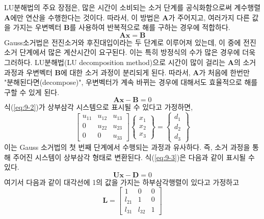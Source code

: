 LU분해법의 주요 장점은, 많은 시간이 소비되는 소거 단계를 공식화함으로써 계수행렬 $\mathbf{A}$에만 연산을 수행한다는 것이다. 따라서, 이 방법은 $\mathbf{A}$가 주어지고, 여러가지 다른 값을 가지는 우변벡터 $\mathbf{B}$를 사용하여 반복적으로 해를 구하는 경우에 적합하다.
\begin{equation}\label{eq:9-1}
\mathbf{Ax}=\mathbf{B}
\end{equation}
Gauss소거법은 전진소거와 후진대입이라는 두 단계로 이루어져 있는데, 이 중에 전진소거 단계에서 많은 계산시간이 요구된다. 이는 특히 방정식의 수가 많은 경우에 더욱 그러하다. LU분해법(LU decomposition method)으로 시간이 많이 걸리는 $\mathbf{A}$의 소거 과정과 우변벡터 $\mathbf{B}$에 대한 소거 과정이 분리되게 된다. 따라서, $\mathbf{A}$가 처음에 한번만 "분해된다면(decompose)", 우변벡터가 계속 바뀌는 경우에 대해서도 효율적으로 해를 구할 수 있게 된다.
\begin{equation}\label{eq:9-2}
\mathbf{Ax}-\mathbf{B}=0
\end{equation}
식(\ref{eq:9-2})가 상부삼각 시스템으로 표시될 수 있다고 가정하면,
\begin{equation}\label{eq:9-3}
\begin{bmatrix}u_{11}&u_{12}&u_{13}\\0&u_{22}&u_{23}\\0&0&u_{33}\end{bmatrix}\begin{Bmatrix}x_{1}\\x_{2}\\x_{3}\end{Bmatrix}=\begin{Bmatrix}d_{1}\\d_{2}\\d_{3}\end{Bmatrix}
\end{equation}
이는 Gauss 소거법의 첫 번째 단계에서 수행되는 과정과 유사하다. 즉, 소거 과정을 통해 주어진 시스템이 상부삼각 형태로 변환된다. 식(\ref{eq:9-3})은 다음과 같이 표시될 수 있다.
\begin{equation}\label{eq:9-4}
\mathbf{Ux}-\mathbf{D}=0
\end{equation}
여기서 다음과 같이 대각선에 1의 값을 가지는 하부삼각행렬이 있다고 가정하고
\begin{equation}\label{eq:9-5}
\mathbf{L}=\begin{bmatrix}1&0&0\\l_{21}&1&0\\l_{31}&l_{32}&1\end{bmatrix}
\end{equation}
